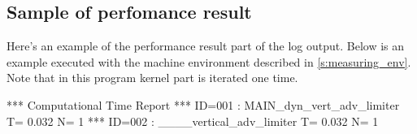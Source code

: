 \subsection{Sample of perfomance result}

Here's an example of the performance result part of the log output.
Below is an example executed with the machine environment described in \autoref{s:measuring_env}.
%
Note that in this program kernel part is iterated one time.

\begin{LstLog}
 *** Computational Time Report
 *** ID=001 : MAIN_dyn_vert_adv_limiter        T=     0.032 N=      1
 *** ID=002 : ____vertical_adv_limiter         T=     0.032 N=      1
\end{LstLog}

